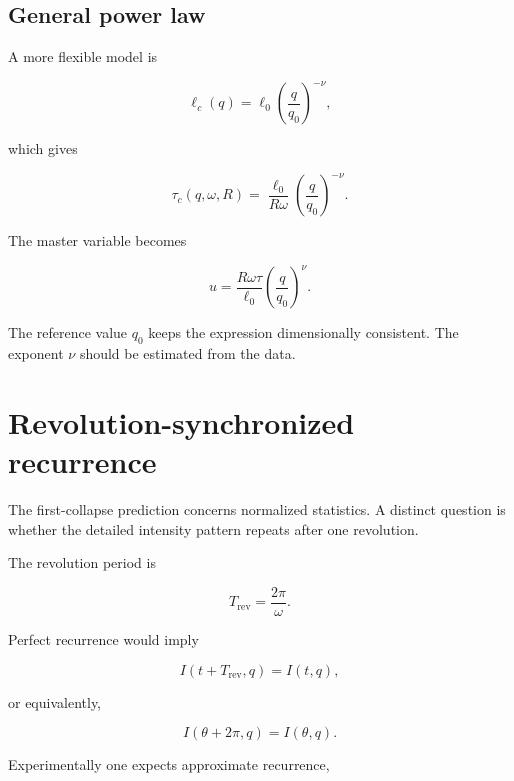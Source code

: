 \documentclass[11pt,letterpaper]{article}
\begin{document}
\subsection{General power law}

A more flexible model is

\begin{equation}
    \ell_c(q)
    =
    \ell_0
    \left(\frac{q}{q_0}\right)^{-\nu},
    \label{eq:q_power_law}
\end{equation}

which gives

\begin{equation}
    \tau_c(q,\omega,R)
    =
    \frac{\ell_0}{R\omega}
    \left(\frac{q}{q_0}\right)^{-\nu}.
\end{equation}

The master variable becomes

\begin{equation}
    u
    =
    \frac{R\omega\tau}{\ell_0}
    \left(\frac{q}{q_0}\right)^\nu.
\end{equation}

The reference value $q_0$ keeps the expression dimensionally consistent.
The exponent $\nu$ should be estimated from the data.

\section{Revolution-synchronized recurrence}

The first-collapse prediction concerns normalized statistics. A distinct
question is whether the detailed intensity pattern repeats after one
revolution.

The revolution period is

\begin{equation}
    T_{\mathrm{rev}}=\frac{2\pi}{\omega}.
\end{equation}

Perfect recurrence would imply

\begin{equation}
    I(t+T_{\mathrm{rev}},q)
    =
    I(t,q),
\end{equation}

or equivalently,

\begin{equation}
    I(\theta+2\pi,q)=I(\theta,q).
\end{equation}

Experimentally one expects approximate recurrence,
\end{document}
